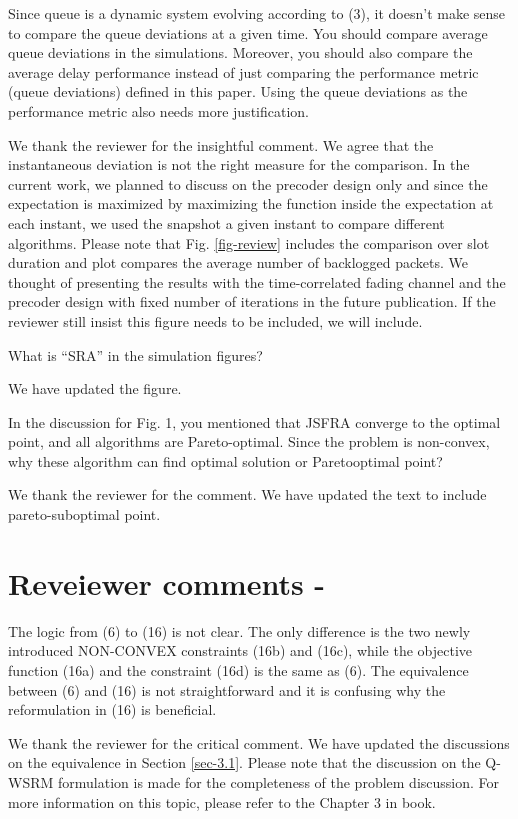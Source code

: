  Since queue is a dynamic system evolving according to (3), it doesn’t make sense to compare the queue deviations at a given time. You should compare average queue deviations in the simulations. Moreover, you should also compare the average delay performance instead of just comparing the performance metric (queue deviations) defined in this paper. Using the queue deviations as the performance metric also needs more justification.

\resp We thank the reviewer for the insightful comment. We agree that the instantaneous deviation is not the right measure for the comparison. In the current work, we planned to discuss on the precoder design only and since the expectation is maximized by maximizing the function inside the expectation at each instant, we used the snapshot a given instant to compare different algorithms. Please note that Fig. \ref{fig-review} includes the comparison over  slot duration and plot compares the average number of backlogged packets. We thought of presenting the results with the time-correlated fading channel and the precoder design with fixed number of iterations in the future publication. If the reviewer still insist this figure needs to be included, we will include.

 What is “SRA” in the simulation figures?

\resp We have updated the figure.

 In the discussion for Fig. 1, you mentioned that JSFRA converge to the optimal point, and all algorithms are Pareto-optimal. Since the problem is non-convex, why these algorithm can find optimal solution or Paretooptimal point? 

\resp We thank the reviewer for the comment. We have updated the text to include pareto-suboptimal point.


\section*{Reveiewer comments - }

 The logic from (6) to (16) is not clear. The only difference is the two newly introduced NON-CONVEX constraints (16b) and (16c), while the objective function (16a) and the constraint (16d) is the same as (6). The equivalence between (6) and (16) is not straightforward and it is confusing why the reformulation in (16) is beneficial.

\resp We thank the reviewer for the critical comment. We have updated the discussions on the equivalence in Section \ref{sec-3.1}. Please note that the discussion on the \ac{Q-WSRM} formulation is made for the completeness of the problem discussion. For more information on this topic, please refer to the Chapter 3 in \cite{neely2010stochastic} book.

